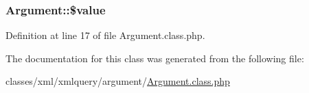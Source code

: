 \hypertarget{classArgument_a762eb8881d615f61189bba09b9bd7300}{
\subsubsection[{\$value}]{\setlength{\rightskip}{0pt plus 5cm}Argument\-::\$value}}\label{classArgument_a762eb8881d615f61189bba09b9bd7300}


Definition at line 17 of file Argument.\-class.\-php.



The documentation for this class was generated from the following file\-:\begin{DoxyCompactItemize}
\item 
classes/xml/xmlquery/argument/\hyperlink{Argument_8class_8php}{Argument.\-class.\-php}\end{DoxyCompactItemize}
